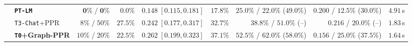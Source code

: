 \documentclass{article}
\begin{document}
\begin{table}[t]
\begin{center}
\begin{tabular}{llrrrrrrr}
 & \textbf{\texttt{PT-LM}} & $\mathbf{0\%\;/\;0\%}$ & $\mathbf{0.0\%}$ & $0.148\;[0.115, 0.181]$ & $17.8\%$ & $25.0\%$ / $22.0\%$ ($49.0\%$) & $0.200$ / $12.5\%$ ($30.0\%$) & $4.91$\,s \\
 & \texttt{T3-Chat}+PPR & $8\%\;/\;50\%$ & $27.5\%$ & $0.242\;[0.177, 0.317]$ & $32.7\%$ & $38.8\%$ / $51.0\%$ (--) & $\mathbf{0.216}$ / $20.0\%$ (--) & $1.83$\,s \\
 & \textbf{\texttt{T0}+Graph-PPR} & $10\%\;/\;20\%$ & $22.5\%$ & $\mathbf{0.262\;[0.199, 0.323]}$ & $\mathbf{37.1\%}$ & $\mathbf{52.5\%}$ / $\mathbf{62.0\%}$ ($\mathbf{58.0\%}$) & $0.156$ / $\mathbf{25.0\%}$ ($\mathbf{37.5\%}$) & $\mathbf{1.64}$\,s \\
\bottomrule
\end{tabular}
\end{center}
\vskip -0.14in
\end{table}
\end{document}
